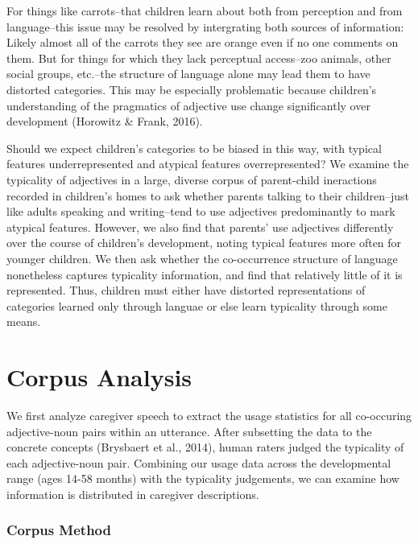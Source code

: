 \documentclass[10pt, letterpaper]{article}
\begin{document}
For things like carrots--that children learn about both from perception
and from language--this issue may be resolved by intergrating both
sources of information: Likely almost all of the carrots they see are
orange even if no one comments on them. But for things for which they
lack perceptual access--zoo animals, other social groups, etc.--the
structure of language alone may lead them to have distorted categories.
This may be especially problematic because children's understanding of
the pragmatics of adjective use change significantly over development
(Horowitz \& Frank, 2016).

Should we expect children's categories to be biased in this way, with
typical features underrepresented and atypical features overrepresented?
We examine the typicality of adjectives in a large, diverse corpus of
parent-child ineractions recorded in children's homes to ask whether
parents talking to their children--just like adults speaking and
writing--tend to use adjectives predominantly to mark atypical features.
However, we also find that parents' use adjectives differently over the
course of children's development, noting typical features more often for
younger children. We then ask whether the co-occurrence structure of
language nonetheless captures typicality information, and find that
relatively little of it is represented. Thus, children must either have
distorted representations of categories learned only through languae or
else learn typicality through some means.

\hypertarget{corpus-analysis}{%
\section{Corpus Analysis}\label{corpus-analysis}}

We first analyze caregiver speech to extract the usage statistics for
all co-occuring adjective-noun pairs within an utterance. After
subsetting the data to the concrete concepts (Brysbaert et al., 2014),
human raters judged the typicality of each adjective-noun pair.
Combining our usage data across the developmental range (ages 14-58
months) with the typicality judgements, we can examine how information
is distributed in caregiver descriptions.

\hypertarget{corpus-method}{%
\subsubsection{Corpus Method}\label{corpus-method}}
\end{document}
